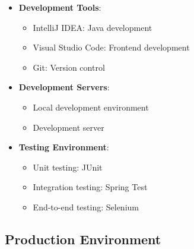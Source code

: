 \documentclass[a4paper,12pt]{article}
\begin{document}
\begin{itemize}
  \item \textbf{Development Tools}:
    \begin{itemize}
      \item IntelliJ IDEA: Java development
      \item Visual Studio Code: Frontend development
      \item Git: Version control
    \end{itemize}
  
  \item \textbf{Development Servers}:
    \begin{itemize}
      \item Local development environment
      \item Development server
    \end{itemize}
  
  \item \textbf{Testing Environment}:
    \begin{itemize}
      \item Unit testing: JUnit
      \item Integration testing: Spring Test
      \item End-to-end testing: Selenium
    \end{itemize}
\end{itemize}

\subsection{Production Environment}
\end{document}
